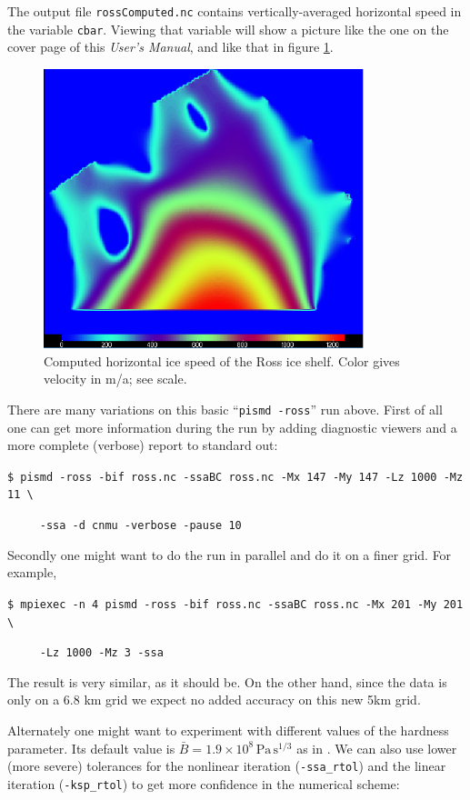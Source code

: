 \documentclass[11pt,final]{amsart}
\begin{document}
The output file \verb|rossComputed.nc| contains vertically-averaged horizontal speed in the variable \verb|cbar|.  Viewing that variable will show a picture like the one on the cover page of this \emph{User's Manual}, and like that in figure \ref{fig:rossspeed}.

\begin{figure}[ht]
\includegraphics[height=3.2in,keepaspectratio=true]{figs/rossspeed}
\caption{Computed horizontal ice speed of the Ross ice shelf.  Color gives velocity in m/a; see scale.}
\label{fig:rossspeed}
\end{figure}

There are many variations on this basic ``\verb|pismd -ross|'' run above.  First of all one can get more information during the run by adding diagnostic viewers and a more complete (verbose) report to standard out:

\verb|$ pismd -ross -bif ross.nc -ssaBC ross.nc -Mx 147 -My 147 -Lz 1000 -Mz 11 \|

\verb|     -ssa -d cnmu -verbose -pause 10|

\noindent Secondly one might want to do the run in parallel and do it on a finer grid.  For example,

\verb|$ mpiexec -n 4 pismd -ross -bif ross.nc -ssaBC ross.nc -Mx 201 -My 201 \|

\verb|     -Lz 1000 -Mz 3 -ssa|

\noindent The result is very similar, as it should be.  On the other hand, since the data is only on a 6.8 km grid we expect no added accuracy on this new 5km grid.

Alternately one might want to experiment with different values of the hardness parameter.  Its default value is $\bar B = 1.9 \times 10^8 \, \text{Pa}\, \text{s}^{1/3}$ as in \cite{MacAyealetal}.   We can also use lower (more severe) tolerances for the nonlinear iteration (\verb|-ssa_rtol|) and the linear iteration (\verb|-ksp_rtol|) to get more confidence in the numerical scheme:
\end{document}

